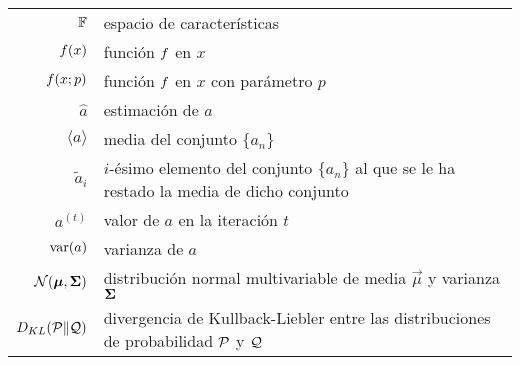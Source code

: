 \begin{longtable}{rp{}}
  $\mathbb{F}$         & espacio de características \\
  $\mathnormal{f}(x)$     & función $\mathnormal{f}$ en $x$ \\
  $\mathnormal{f}(x;p)$   & función $\mathnormal{f}$ en $x$ con parámetro $p$\\
  $\hat{a}$         & estimación de $a$ \\
  $\langle{a}\rangle$ & media del conjunto $\{a_n\}$ \\
  $\tilde{a}_i$     & $i$-ésimo elemento del conjunto $\{a_n\}$ al que se le ha
    restado la media de dicho conjunto \\
  $a^{(t)}$         & valor de $a$ en la iteración $t$ \\
  $\operatorname*{var}(a)$         & varianza de $a$ \\
  $\mathcal{N}(\boldsymbol{\mu},\boldsymbol{\Sigma})$  & distribución normal multivariable de media
    $\vec{\mu}$ y varianza $\boldsymbol{\Sigma}$ \\
  $\mathnormal{D}_{KL}(\mathcal{P}\|\mathcal{Q})$ & divergencia de Kullback-Liebler entre
    las distribuciones de probabilidad $\mathcal{P}$ y $\mathcal{Q}$
\end{longtable}
